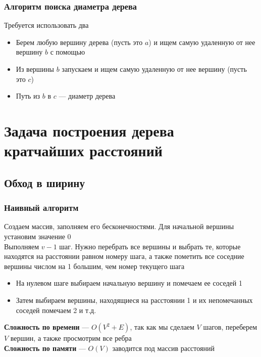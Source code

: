 \documentclass[a4paper]{article}
\begin{document}
\subsubsection*{Алгоритм поиска диаметра дерева}
Требуется использовать два \dfs
\begin{itemize}
    \item Берем любую вершину дерева (пусть это $a$) и ищем самую удаленную от нее вершину $b$ с помощью \dfs
    \item Из вершины $b$ запускаем \dfs и ищем самую удаленную от нее вершину (пусть это $c$)
    \item Путь из $b$ в $c$ — диаметр дерева
\end{itemize}



\newpage
\section{Задача построения дерева кратчайших расстояний}
\subsection{Обход в ширину}
\subsubsection*{Наивный алгоритм}
Создаем массив, заполняем его бесконечностями. Для начальной вершины установим значение 0\\[2mm]
\indent Выполняем $v-1$ шаг. Нужно перебрать все вершины и выбрать те, которые находятся на расстоянии равном номеру шага, а также пометить все соседние вершины числом на 1 большим, чем номер текущего шага
\begin{itemize}
    \item На нулевом шаге выбираем начальную вершину и помечаем ее соседей 1
    \item Затем выбираем вершины, находящиеся на расстоянии 1 и их непомечанных соседей помечаем 2 и т.д.
\end{itemize}
\textbf{Сложность по времени} — $O(V^2+E)$, так как мы сделаем $V$ шагов, переберем $V$ вершин, а также просмотрим все ребра\\[2mm]
\textbf{Сложность по памяти} — $O(V)$ заводится под массив расстояний
\end{document}
